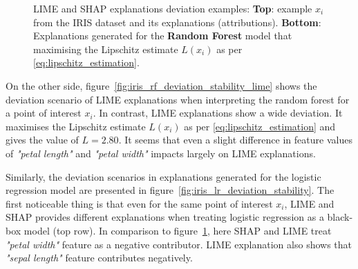 \documentclass[english]{tktltiki2}
\theoremstyle{definition}
\theoremstyle{remark}
\begin{document}
\begin{figure}[H]
	\hspace*{\fill}%
	\caption{LIME and SHAP explanations deviation examples: \textbf{Top}: example $x_i$ from the IRIS dataset and its explanations (attributions). \textbf{Bottom}: Explanations generated for the \textbf{Random Forest} model that maximising the Lipschitz estimate $L(x_i)$ as per \eqref{eq:lipschitz_estimation}.}%
	\label{fig:iris_rf_deviation_stability}%
\end{figure}

On the other side, figure~\ref{fig:iris_rf_deviation_stability_lime} shows the deviation scenario of LIME explanations when interpreting the random forest for a point of interest $x_i$. In contrast, LIME explanations show a wide deviation. It maximises the Lipschitz estimate $L(x_i)$ as per \eqref{eq:lipschitz_estimation} and gives the value of $L=2.80$. It seems that even a slight difference in feature values of \textit{"petal length"} and \textit{"petal width"} impacts largely on LIME explanations.


Similarly, the deviation scenarios in explanations generated for the logistic regression model are presented in figure~\ref{fig:iris_lr_deviation_stability}. The first noticeable thing is that even for the same point of interest $x_i$, LIME and SHAP provides different explanations when treating logistic regression as a black-box model (top row). In comparison to figure~\ref{fig:iris_rf_deviation_stability}, here SHAP and LIME treat \textit{"petal width"} feature as a negative contributor. LIME explanation also shows that \textit{"sepal length"} feature contributes negatively.
\end{document}
